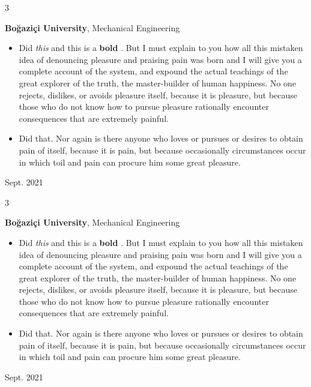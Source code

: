 \documentclass[10pt, letterpaper]{article}
\newenvironment{highlights}{
    \begin{itemize}[
        topsep=0.10 cm,
        parsep=0.10 cm,
        partopsep=0pt,
        itemsep=0pt,
        leftmargin=0.4 cm + 10pt
    ]
}{
    \end{itemize}
} %
\newenvironment{threecolentry}[3][]{
    \onecolentry
    \def\thirdColumn{#3}
    \setcolumnwidth{1 cm, \fill, 4.5 cm}
    \begin{paracol}{3}
    {\raggedright #2} \switchcolumn
}{
    \switchcolumn \raggedleft \thirdColumn
    \end{paracol}
    \endonecolentry
} %
\let\hrefWithoutArrow\href
\renewcommand{\href}[2]{\hrefWithoutArrow{#1}{\mbox{\ifthenelse{\equal{#2}{}}{ }{#2 }\raisebox{.15ex}{\footnotesize \faExternalLink*}}}}
\begin{document}
        \vspace{0.2 cm}

        \begin{threecolentry}{\textbf{}}{
            Sept. 2021
        }
            \textbf{Boğaziçi University}, Mechanical Engineering
            \begin{highlights}
                \item Did \textit{this} and this is a \textbf{bold} \href{https://example.com}{link}. But I must explain to you how all this mistaken idea of denouncing pleasure and praising pain was born and I will give you a complete account of the system, and expound the actual teachings of the great explorer of the truth, the master-builder of human happiness. No one rejects, dislikes, or avoids pleasure itself, because it is pleasure, but because those who do not know how to pursue pleasure rationally encounter consequences that are extremely painful.
                \item Did that. Nor again is there anyone who loves or pursues or desires to obtain pain of itself, because it is pain, but because occasionally circumstances occur in which toil and pain can procure him some great pleasure.
            \end{highlights}
        \end{threecolentry}

        \vspace{0.2 cm}

        \begin{threecolentry}{\textbf{}}{
            Sept. 2021
        }
            \textbf{Boğaziçi University}, Mechanical Engineering
            \begin{highlights}
                \item Did \textit{this} and this is a \textbf{bold} \href{https://example.com}{link}. But I must explain to you how all this mistaken idea of denouncing pleasure and praising pain was born and I will give you a complete account of the system, and expound the actual teachings of the great explorer of the truth, the master-builder of human happiness. No one rejects, dislikes, or avoids pleasure itself, because it is pleasure, but because those who do not know how to pursue pleasure rationally encounter consequences that are extremely painful.
                \item Did that. Nor again is there anyone who loves or pursues or desires to obtain pain of itself, because it is pain, but because occasionally circumstances occur in which toil and pain can procure him some great pleasure.
            \end{highlights}
        \end{threecolentry}
\end{document}
